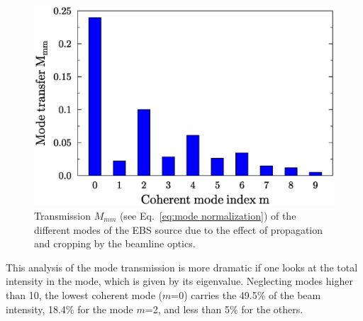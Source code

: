\documentclass{iucr}              %
\begin{document}

\begin{figure}\label{fig:mode transmission}
    \centering
        \includegraphics[width=\textwidth]{GRAPHICS/propagated_modes.eps}
    \caption{Transmission $M_{mm}$ (see Eq.~\ref{eq:mode normalization}) of the different modes of the EBS source  due to the effect of propagation and cropping by the beamline optics.}
\end{figure}

This analysis of the mode transmission is more dramatic if one looks at the total intensity in the mode, which is given by its eigenvalue. Neglecting modes higher than 10, the lowest coherent mode ($m$=0) carries the 49.5\% of the beam intensity, 18.4\% for the mode $m$=2, and less than 5\% for the others. 
\end{document}
